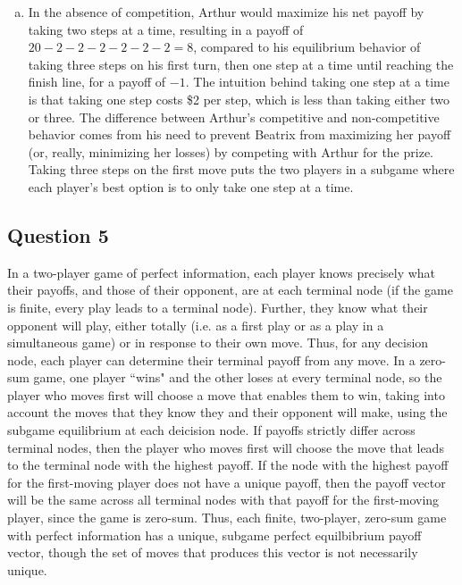 \documentclass{article}
\begin{document}
\begin{enumerate}[(a)]
	\item In the absence of competition, Arthur would maximize his net payoff by taking two steps at a time, resulting in a payoff of ${20-2-2-2-2-2-2=8}$, compared to his equilibrium behavior of taking three steps on his first turn, then one step at a time until reaching the finish line, for a payoff of $-1$. The intuition behind taking one step at a time is that taking one step costs \$2 per step, which is less than taking either two or three. The difference between Arthur's competitive and non-competitive behavior comes from his need to prevent Beatrix from maximizing her payoff (or, really, minimizing her losses) by competing with Arthur for the prize. Taking three steps on the first move puts the two players in a subgame where each player's best option is to only take one step at a time.
	
\end{enumerate}


\subsection*{Question 5}
In a two-player game of perfect information, each player knows precisely what their payoffs, and those of their opponent, are at each terminal node (if the game is finite, every play leads to a terminal node). Further, they know what their opponent will play, either totally (i.e. as a first play or as a play in a simultaneous game) or in response to their own move. Thus, for any decision node, each player can determine their terminal payoff from any move. In a zero-sum game, one player ``wins" and the other loses at every terminal node, so the player who moves first will choose a move that enables them to win, taking into account the moves that they know they and their opponent will make, using the subgame equilibrium at each deicision node. If payoffs strictly differ across terminal nodes, then the player who moves first will choose the move that leads to the terminal node with the highest payoff. If the node with the highest payoff for the first-moving player does not have a unique payoff, then the payoff vector will be the same across all terminal nodes with that payoff for the first-moving player, since the game is zero-sum. Thus, each finite, two-player, zero-sum game with perfect information has a unique, subgame perfect equilbibrium payoff vector, though the set of moves that produces this vector is not necessarily unique.
\end{document}
